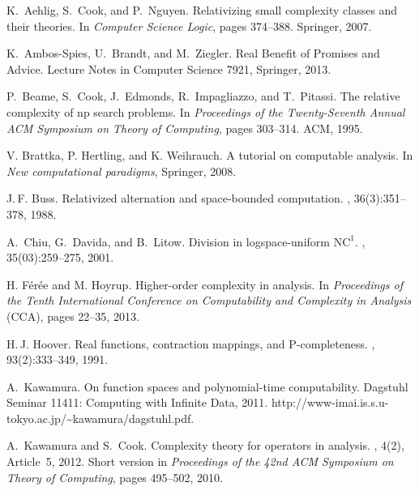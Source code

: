\documentclass[envcountsect,envcountsame,orivec,oribibl]{llncs}
\begin{document}
\begin{thebibliography}{10}

K.~Aehlig, S.~Cook, and P.~Nguyen.
\newblock Relativizing small complexity classes and their theories.
\newblock In {\em Computer Science Logic}, pages 374--388. Springer, 2007.

K.~Ambos-Spies, U.~Brandt, and M.~Ziegler. 
\newblock
Real Benefit of Promises and Advice. 
\newblock
Lecture Notes in Computer Science 7921, 
Springer, 2013. 

P.~Beame, S.~Cook, J.~Edmonds, R.~Impagliazzo, and T.~Pitassi.
\newblock The relative complexity of np search problems.
\newblock In {\em Proceedings of the Twenty-Seventh Annual ACM Symposium on
  Theory of Computing}, pages 303--314. ACM, 1995.

V. Brattka, P. Hertling, and K. Weihrauch. 
\newblock A tutorial on computable analysis. 
\newblock In \emph{New computational paradigms}, Springer, 2008. 


J.\,F. Buss.
\newblock Relativized alternation and space-bounded computation.
, 36(3):351--378, 1988.

A.~Chiu, G.~Davida, and B.~Litow.
\newblock Division in logspace-uniform $\mathrm{NC}^1$.
,
  35(03):259--275, 2001.

H. F\'er\'ee and M. Hoyrup. 
\newblock Higher-order complexity in analysis. 
\newblock In \emph{Proceedings of the Tenth International Conference on Computability and Complexity in Analysis} (CCA), pages 22--35, 2013.

H.\,J. Hoover.
\newblock Real functions, contraction mappings, and $\mathrm{P}$-completeness.
, 93(2):333--349, 1991.

A.~Kawamura.
\newblock On function spaces and polynomial-time computability.
\newblock Dagstuhl Seminar 11411: Computing with Infinite Data, 2011.
\newblock http://www-imai.is.s.u-tokyo.ac.jp/{\~{}}kawamura/dagstuhl.pdf.

A.~Kawamura and S.~Cook.
\newblock Complexity theory for operators in analysis.
, 4(2), Article~5, 2012.
\newblock Short version in \emph{Proceedings of the 42nd ACM Symposium on Theory of
  Computing}, pages 495--502, 2010.


\end{thebibliography}
\end{document}
